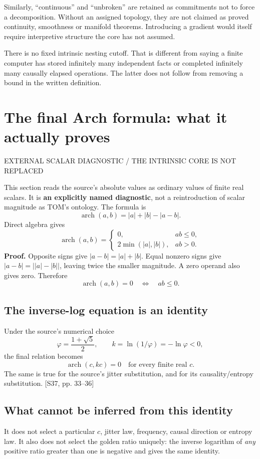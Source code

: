\documentclass[11pt,a4paper]{article}
\newcommand{\newsec}[2]{\clearpage\section{#1}{\sffamily\footnotesize\color{teal}\MakeUppercase{#2}\par}\vspace{5pt}}
\newcommand{\src}[1]{{\small\color{muted}[S37, #1]}}
\newcommand{\ar}{\operatorname{arch}}
\begin{document}
Similarly, ``continuous'' and ``unbroken'' are retained as commitments not to force a decomposition. Without an assigned topology, they are not claimed as proved continuity, smoothness or manifold theorems. Introducing a gradient would itself require interpretive structure the core has not assumed.

\begin{boxx}
There is no fixed intrinsic nesting cutoff. That is different from saying a finite computer has stored infinitely many independent facts or completed infinitely many causally elapsed operations. The latter does not follow from removing a bound in the written definition.
\end{boxx}

\newsec{The final Arch formula: what it actually proves}{External scalar diagnostic / the intrinsic core is not replaced}
This section reads the source's absolute values as ordinary values of finite real scalars. It is \textbf{an explicitly named diagnostic}, not a reintroduction of scalar magnitude as TOM's ontology. The formula is
\[
 \ar(a,b)=|a|+|b|-|a-b|.
\]
Direct algebra gives
\[
 \boxed{\ar(a,b)=
 \begin{cases}
 0,&ab\le0,\\
 2\min(|a|,|b|),&ab>0.
 \end{cases}}
\]
\textbf{Proof.} Opposite signs give $|a-b|=|a|+|b|$. Equal nonzero signs give $|a-b|=\bigl||a|-|b|\bigr|$, leaving twice the smaller magnitude. A zero operand also gives zero. Therefore
\[
 \ar(a,b)=0\quad\Longleftrightarrow\quad ab\le0.
\]

\subsection{The inverse-log equation is an identity}
Under the source's numerical choice
\[
 \varphi=\frac{1+\sqrt5}{2},\qquad k=\ln(1/\varphi)=-\ln\varphi<0,
\]
the final relation becomes
\[
 \boxed{\ar(c,kc)=0\quad\text{for every finite real }c.}
\]
The same is true for the source's jitter substitution, and for its causality/entropy substitution. \src{pp. 33--36}

\subsection{What cannot be inferred from this identity}
It does not select a particular $c$, jitter law, frequency, causal direction or entropy law. It also does not select the golden ratio uniquely: the inverse logarithm of \emph{any} positive ratio greater than one is negative and gives the same identity.
\end{document}
